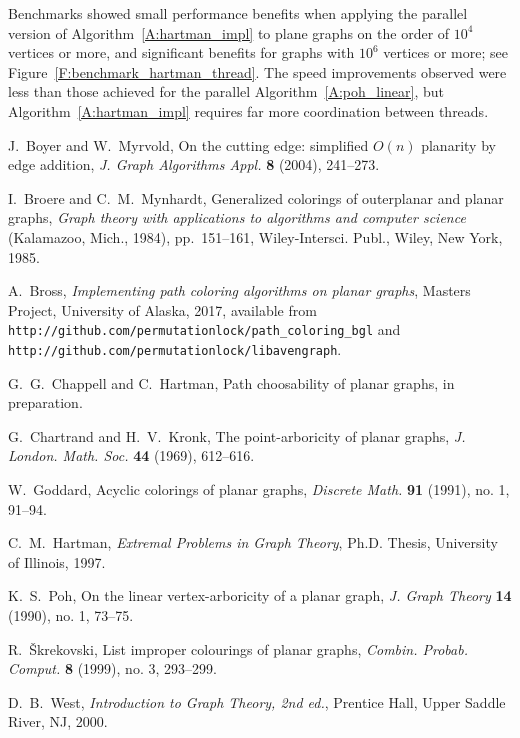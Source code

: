 \documentclass[12pt,letterpaper]{article}
\theoremstyle{plain}
\theoremstyle{definition}
\theoremstyle{break}
\begin{document}
Benchmarks showed small performance benefits when applying the parallel
version of Algorithm~\ref{A:hartman_impl} to plane graphs on the order
of $10^4$ vertices or more, and significant benefits for graphs with
$10^6$ vertices or more; see Figure~\ref{F:benchmark_hartman_thread}.
The speed improvements observed were less than those achieved for the
parallel
Algorithm~\ref{A:poh_linear}, but Algorithm~\ref{A:hartman_impl} requires
far more coordination between threads.

\begin{thebibliography}{99}

J.~Boyer and W.~Myrvold, On the cutting edge: simplified $O(n)$ planarity by edge
addition,
\textit{J. Graph Algorithms Appl.}
\textbf{8} (2004),
241--273.

I.~Broere and C.~M.~Mynhardt,
Generalized colorings of outerplanar and planar graphs,
\textit{Graph theory with applications to algorithms and computer science}
 (Kalamazoo, Mich., 1984),
pp.~151--161,
Wiley-Intersci. Publ., Wiley, New York, 1985.

A.~Bross,
\textit{Implementing path coloring algorithms on planar graphs},
Masters Project,
University of Alaska,
2017,
available from\hfil\break
\texttt{http://github.com/permutationlock/path\_coloring\_bgl} and\hfil\break
\texttt{http://github.com/permutationlock/libavengraph}.

G.~G.~Chappell and C.~Hartman,
Path choosability of planar graphs,
in preparation.

G.~Chartrand and H.~V.~Kronk,
The point-arboricity of planar graphs,
\textit{J. London. Math. Soc.}
\textbf{44} (1969),
612--616.

W.~Goddard,
Acyclic colorings of planar graphs,
\textit{Discrete Math.}
\textbf{91} (1991), no. 1,
91--94.

C.~M.~Hartman,
\textit{Extremal Problems in Graph Theory},
Ph.D. Thesis,
University of Illinois,
1997.

K.~S.~Poh,
On the linear vertex-arboricity of a planar graph,
\textit{J. Graph Theory}
\textbf{14} (1990), no. 1,
73--75.

R.~\v{S}krekovski,
List improper colourings of planar graphs,
\textit{Combin. Probab. Comput.}
\textbf{8} (1999), no. 3,
293--299.

D.~B.~West,
\textit{Introduction to Graph Theory, 2nd ed.},
Prentice Hall,
Upper Saddle River, NJ,
2000.

\end{thebibliography}
\end{document}
